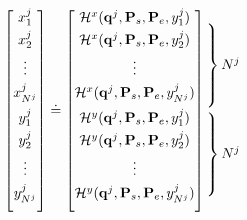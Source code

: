 \begin{equation} \label{eq:obs-camera1}
\begin{bmatrix}
 x^j_{1}\\[0.3em]
 x^j_{2}\\[0.3em]
 \vdots\\[0.3em]
 x^j_{N^j}\\[0.5em]
 y^j_{1}\\[0.3em]
 y^j_{2}\\[0.3em]
 \vdots\\[0.3em]
 y^j_{N^j}\\[0.8em]
\end{bmatrix}
\doteq %
\begin{bmatrix}
 \mathcal{H}^x(\mathbf{q}^j,\mathbf{P}_s,\mathbf{P}_e,y^j_{1})\\[0.3em]
 \mathcal{H}^x(\mathbf{q}^j,\mathbf{P}_s,\mathbf{P}_e,y^j_{2})\\[0.3em]
 \vdots\\[0.3em]
 \mathcal{H}^x(\mathbf{q}^j,\mathbf{P}_s,\mathbf{P}_e,y^j_{N^j})\\[0.5em]
 \mathcal{H}^y(\mathbf{q}^j,\mathbf{P}_s,\mathbf{P}_e,y^j_{1})\\[0.3em]
 \mathcal{H}^y(\mathbf{q}^j,\mathbf{P}_s,\mathbf{P}_e,y^j_{2})\\[0.3em]
 \vdots\\[0.3em]
 \mathcal{H}^y(\mathbf{q}^j,\mathbf{P}_s,\mathbf{P}_e,y^j_{N^j})\\[0.8em]
\end{bmatrix}
\begin{array}{@{\kern-\nulldelimiterspace}l@{}}
 \left.\begin{array}{@{}c@{}}\\[0.3em] \\[0.3em] \\[0.3em] \\[0.5em] \end{array}\right\} N^j\\
 \left.\begin{array}{@{}c@{}}\\[0.3em] \\[0.3em] \\[0.3em] \\[0.8em] \end{array}\right\} N^j\\
\end{array}
\end{equation}



